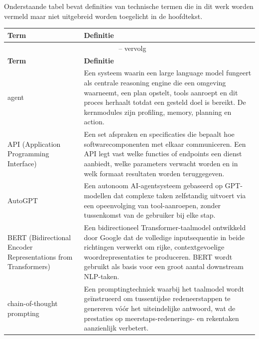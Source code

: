 \chapter{}\label{ch:definities}

Onderstaande tabel bevat definities van technische termen die in dit werk worden vermeld maar niet uitgebreid worden toegelicht in de hoofdtekst.
\setlength{\tabcolsep}{3pt}
\begin{longtable}{p{} p{}}
\toprule
\textbf{Term} & \textbf{Definitie} \\
\midrule
\endfirsthead
\multicolumn{2}{c}{\tablename\ \thetable{} -- vervolg} \\
\toprule
\textbf{Term} & \textbf{Definitie} \\
\midrule
\endhead
\midrule
\endfoot
\bottomrule
\endlastfoot

agent &
    Een systeem waarin een large language model fungeert als centrale reasoning engine die een omgeving waarneemt, een plan opstelt, tools aanroept en dit proces herhaalt totdat een gesteld doel is bereikt. De kernmodules zijn profiling, memory, planning en action. \\
\midrule

API \newline \small(Application Programming Interface) &
    Een set afspraken en specificaties die bepaalt hoe softwarecomponenten met elkaar communiceren. Een API legt vast welke functies of endpoints een dienst aanbiedt, welke parameters verwacht worden en in welk formaat resultaten worden teruggegeven. \\
\midrule

AutoGPT &
    Een autonoom AI-agentsysteem gebaseerd op GPT-modellen dat complexe taken zelfstandig uitvoert via een opeenvolging van tool-aanroepen, zonder tussenkomst van de gebruiker bij elke stap. \\
\midrule

BERT \newline \small(Bidirectional Encoder Representations from Transformers) &
    Een bidirectioneel Transformer-taalmodel ontwikkeld door Google dat de volledige inputsequentie in beide richtingen verwerkt om rijke, contextgevoelige woordrepresentaties te produceren. BERT wordt gebruikt als basis voor een groot aantal downstream NLP-taken. \\
\midrule


chain-of-thought prompting &
    Een promptingtechniek waarbij het taalmodel wordt geïnstrueerd om tussentijdse redeneerstappen te genereren vóór het uiteindelijke antwoord, wat de prestaties op meerstaps-redenerings- en rekentaken aanzienlijk verbetert. \\
\midrule


\end{longtable}
